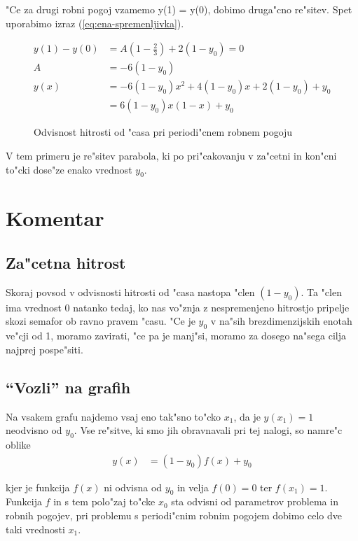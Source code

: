 \documentclass[12pt]{article}
\begin{document}
"Ce za drugi robni pogoj vzamemo y(1) = y(0), dobimo druga"cno re"sitev. Spet uporabimo izraz (\ref{eq:ena-spremenljivka}). 

\begin{align}
y(1) - y(0) &= A(1-\frac{2}{3}) + 2(1-y_0) = 0 \\
A &= -6(1-y_0) \\
y(x) &=  -6(1-y_0)x^2 + 4(1-y_0)x + 2(1-y_0) + y_0 \\
&= 6(1-y_0)x(1-x) + y_0
\end{align}

\begin{figure}[h!]


\label{fig:periodicno} 
\caption{Odvisnost hitrosti od "casa pri periodi"cnem robnem pogoju}
\end{figure}

V tem primeru je re"sitev parabola, ki po pri"cakovanju v za"cetni in kon"cni to"cki dose"ze enako vrednost $y_0$.

\section{Komentar}

\subsection{Za"cetna hitrost}

Skoraj povsod v odvisnosti hitrosti od "casa nastopa "clen $(1-y_0)$. Ta "clen ima vrednost 0 natanko tedaj, ko nas vo"znja z nespremenjeno hitrostjo pripelje skozi semafor ob ravno pravem "casu. "Ce je $y_0$ v na"sih brezdimenzijskih enotah ve"cji od 1, moramo zavirati, "ce pa je manj"si, moramo za dosego na"sega cilja najprej pospe"siti. 

\subsection{``Vozli'' na grafih}

Na vsakem grafu najdemo vsaj eno tak"sno to"cko $x_1$, da je $y(x_1) = 1$ neodvisno od $y_0$. Vse re"sitve, ki smo jih obravnavali pri tej nalogi, so namre"c oblike
\begin{align}
  y(x) &= (1-y_0)f(x) + y_0
\end{align}

kjer je funkcija $f(x)$ ni odvisna od $y_0$ in velja $f(0) = 0$ ter $f(x_1) = 1$. Funkcija $f$ in s tem polo"zaj to"cke $x_0$ sta odvisni od parametrov problema in robnih pogojev, pri problemu s periodi"cnim robnim pogojem dobimo celo dve taki vrednosti $x_1$. 
\end{document}
